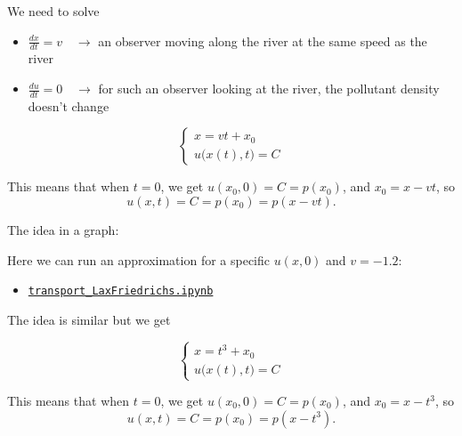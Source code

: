 \begin{solution}

\begin{slide}
\begin{parts}

	\item We need to solve
	
	\begin{itemize}
		\item $	\frac{dx}{dt} = v \quad \to$  an observer moving along the river at the same speed as the river
		\item $ \frac{du}{dt} = 0 \quad \to $ for such an observer looking at the river, the pollutant density doesn't change
	\end{itemize}

		\[
	\begin{cases}
		x = vt + x_0 \\
		u\big(x(t),t\big) = C
	\end{cases}
	\]
	
	This means that when $t=0$, we get $u(x_0,0) = C = p(x_0)$, and $x_0 = x - vt$, so
	\[
	u(x,t) = C = p(x_0) = p(x-vt).
	\]
	
	The idea in a graph:
	\begin{center}
	\end{center}

	Here we can run an approximation for a specific $u(x,0)$ and $v = -1.2$: 
	\begin{itemize}
		\item \href{https://utoronto.syzygy.ca/jupyter/user-redirect/git-pull?repo=https://github.com/bigfatbernie/IBLMathModeling&subPath=book/python/transport_LaxFriedrichs.ipynb}{\tt transport\_LaxFriedrichs.ipynb}
	\end{itemize}

	\item The idea is similar but we get 
	
			\[
	\begin{cases}
		x = t^3 + x_0 \\
		u\big(x(t),t\big) = C
	\end{cases}
	\]
	
	This means that when $t=0$, we get $u(x_0,0) = C = p(x_0)$, and $x_0 = x - t^3$, so
	\[
	u(x,t) = C = p(x_0) = p(x-t^3).
	\]

		
\end{parts}

\end{slide}
	
\end{solution}




